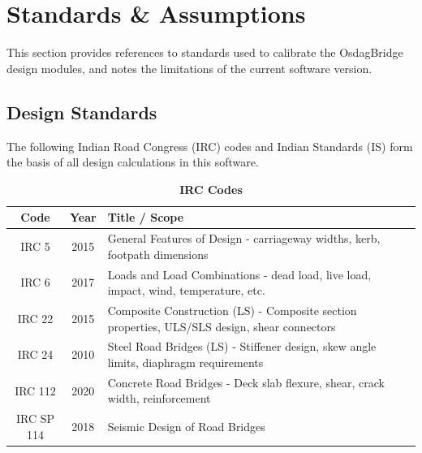 \documentclass[12pt,a4paper]{report}
\numberwithin{table}{chapter}
\numberwithin{figure}{chapter}
\begin{document}
\chapter{Standards \& Assumptions}
\label{ch:Design Standards}

This section provides references to standards used to calibrate the OsdagBridge
design modules, and notes the limitations of the current software version.

\section{Design Standards}
\label{sec:design_standards}

The following Indian Road Congress (IRC) codes and Indian Standards (IS) 
form the basis of all design calculations in this software.

\vspace{0.4cm}

\begingroup
\setlength{\tabcolsep}{3.5pt}
\begin{table}[H]
\caption{\textbf{IRC Codes}}
\begin{tabular}{|c|c|p{13cm}|}
\hline
\textbf{Code} & \textbf{Year} & \textbf{Title / Scope} \\ 
\hline
IRC 5 & 2015 & General Features of Design - carriageway widths, kerb, footpath dimensions \\ 
\hline
IRC 6 & 2017 & Loads and Load Combinations - dead load, live load, impact, wind, temperature, etc. \\ 
\hline
IRC 22 & 2015 & Composite Construction (LS) - Composite section properties, ULS/SLS design, shear connectors \\ 
\hline
IRC 24 & 2010 & Steel Road Bridges (LS) - Stiffener design, skew angle limits, diaphragm requirements \\ 
\hline
IRC 112 & 2020 & Concrete Road Bridges - Deck slab flexure, shear, crack width, reinforcement \\ 
\hline
IRC SP 114 & 2018 & Seismic Design of Road Bridges \\ 
\hline
\end{tabular}
\end{table}
\end{document}
